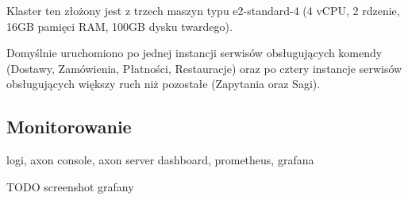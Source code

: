 Klaster ten złożony jest z trzech maszyn typu e2-standard-4 (4 vCPU, 2 rdzenie, 16GB pamięci RAM, 100GB dysku twardego).

Domyślnie uruchomiono po jednej instancji serwisów obsługujących komendy (Dostawy, Zamówienia, Płatności, Restauracje) oraz po cztery instancje serwisów obsługujących większy ruch niż pozostałe (Zapytania oraz Sagi).

\subsection{Monitorowanie}

logi, axon console, axon server dashboard, prometheus, grafana

TODO screenshot grafany